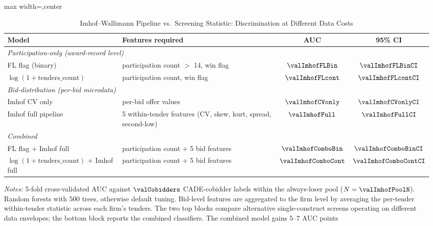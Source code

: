 \begin{table}[htbp]
\centering
\caption{Imhof--Wallimann Pipeline vs.~Screening Statistic: Discrimination at Different Data Costs}
\label{tab:imhof_full}
\begin{adjustbox}{max width=\textwidth,center}
\begin{threeparttable}
\small
\begin{tabular}{p{4.6cm}p{5.6cm}cc}
\toprule
Model & Features required & AUC & 95\% CI \\
\midrule
\multicolumn{4}{l}{\emph{Participation-only (award-record level)}} \\
FL flag (binary)            & participation count $>$ 14, win flag                   & $\valImhofFLBin$ & $\valImhofFLBinCI$ \\
$\log(1{+}\text{tenders\_count})$ & participation count, win flag                    & $\valImhofFLcont$ & $\valImhofFLcontCI$ \\
\midrule
\multicolumn{4}{l}{\emph{Bid-distribution (per-bid microdata)}} \\
Imhof CV only                & per-bid offer values                                  & $\valImhofCVonly$ & $\valImhofCVonlyCI$ \\
Imhof full pipeline          & 5 within-tender features (CV, skew, kurt, spread, second-low) & $\valImhofFull$ & $\valImhofFullCI$ \\
\midrule
\multicolumn{4}{l}{\emph{Combined}} \\
FL flag $+$ Imhof full       & participation count + 5 bid features                  & $\valImhofComboBin$ & $\valImhofComboBinCI$ \\
$\log(1{+}\text{tenders\_count})$ $+$ Imhof full & participation count + 5 bid features & $\valImhofComboCont$ & $\valImhofComboContCI$ \\
\bottomrule
\end{tabular}
\begin{tablenotes}
\small
\item \textit{Notes:} 5-fold cross-validated AUC against
$\valCobidders$ CADE-cobidder labels within the always-loser pool
($N=\valImhofPoolN$).
Random forests with $500$ trees, otherwise default tuning. Bid-level
features are aggregated to the firm level by averaging the per-tender
within-tender statistic across each firm's tenders.
The two top blocks compare alternative single-construct screens
operating on different data envelopes; the bottom block reports the
combined classifiers. The combined model gains $5$--$7$ AUC points

\end{tablenotes}
\end{threeparttable}
\end{adjustbox}
\end{table}
